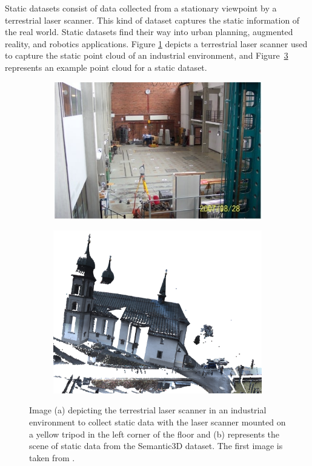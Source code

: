     
    Static datasets consist of data collected from a stationary viewpoint by a terrestrial laser scanner.
    This kind of dataset captures the static information of the real world.
    Static datasets find their way into urban planning, augmented reality, and robotics applications. 
    Figure \ref{fig:tls} depicts a terrestrial laser scanner used to capture the static point cloud of an industrial environment, and Figure~\ref{fig:static_scan} represents an example point cloud for a static dataset.
    \begin{figure}[h!]
        \centering
        \begin{subfigure}{0.45\textwidth}
            \includegraphics[scale=0.45]{images/TLS.jpg}
            \caption{}
            \label{fig:tls}
        \end{subfigure}
        \begin{subfigure}{0.45\textwidth}
            \centering
            \includegraphics[scale=0.2]{images/sem3d_data/1.pdf}
            \caption{}
            \label{fig:static_scan}
        \end{subfigure}

        \caption{	Image (a) depicting the terrestrial laser scanner in an industrial environment to collect static data with the laser scanner mounted on a yellow tripod in the left corner of the floor and 
        (b) represents the scene of static data from the Semantic3D dataset. The first image is taken from \cite{tls}.}
       
    \end{figure}
